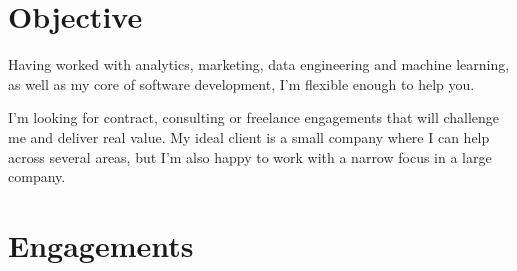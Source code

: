 \documentclass[11pt,a4paper,sans]{moderncv}        %
\begin{document}
\makecvtitle

\section{Objective}
Having worked with analytics, marketing, data engineering and machine learning, as well as my core of software development, I'm flexible enough to help you.


I'm looking for contract, consulting or freelance engagements that will challenge me and deliver real value.
My ideal client is a small company where I can help across several areas, but I'm also happy to work with a narrow focus in a large company.


\section{Engagements}
\end{document}
